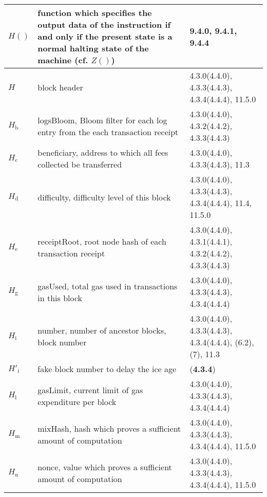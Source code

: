 \documentclass[9pt,oneside]{amsart}
\newcommand{\reff}[1]{{\footnotesize #1}}
\begin{document}
\begin{longtabu}{X[1.2lm] X[3] X}
$H()$ &
function which specifies the output data of the instruction if and only if the present state is a normal halting state of the machine (cf. $Z()$) &
\reff{9.4.0, 9.4.1, 9.4.4} \\\hline

$H$ &
block header &
\reff{4.3.0(4.4.0), 4.3.3(4.4.3), 4.3.4(4.4.4), 11.5.0} \\\hline

$H_{\mathrm{b}}$ &
logsBloom, Bloom filter for each log entry from the each transaction receipt &
\reff{4.3.0(4.4.0), 4.3.2(4.4.2), 4.3.3(4.4.3)} \\\hline

$H_{\mathrm{c}}$ &
beneficiary, address to which all fees collected be transferred &
\reff{4.3.0(4.4.0), 4.3.3(4.4.3), 11.3} \\\hline

$H_{\mathrm{d}}$ &
difficulty, difficulty level of this block &
\reff{4.3.0(4.4.0), 4.3.3(4.4.3), 4.3.4(4.4.4), 11.4, 11.5.0} \\\hline

$H_{\mathrm{e}}$ &
receiptRoot, root node hash of each transaction receipt &
\reff{4.3.0(4.4.0), 4.3.1(4.4.1), 4.3.2(4.4.2), 4.3.3(4.4.3)} \\\hline

$H_{\mathrm{g}}$ &
gasUsed, total gas used in transactions in this block &
\reff{4.3.0(4.4.0), 4.3.3(4.4.3), 4.3.4(4.4.4)} \\\hline

$H_{\mathrm{i}}$ &
number, number of ancestor blocks, block number &
\reff{4.3.0(4.4.0), 4.3.3(4.4.3), 4.3.4(4.4.4), (6.2), (7), 11.3} \\\hline

$H'_{\mathrm{i}}$ &
fake block number to delay the ice age &
\reff{(\textbf{4.3.4})} \\\hline

$H_{\mathrm{l}}$ &
gasLimit, current limit of gas expenditure per block &
\reff{4.3.0(4.4.0), 4.3.3(4.4.3), 4.3.4(4.4.4)} \\\hline

$H_{\mathrm{m}}$ &
mixHash, hash which proves a sufficient amount of computation &
\reff{4.3.0(4.4.0), 4.3.3(4.4.3), 4.3.4(4.4.4), 11.5.0} \\\hline

$H_{\mathrm{n}}$ &
nonce, value which proves a sufficient amount of computation &
\reff{4.3.0(4.4.0), 4.3.3(4.4.3), 4.3.4(4.4.4), 11.5.0} \\\hline


\end{longtabu}
\end{document}
